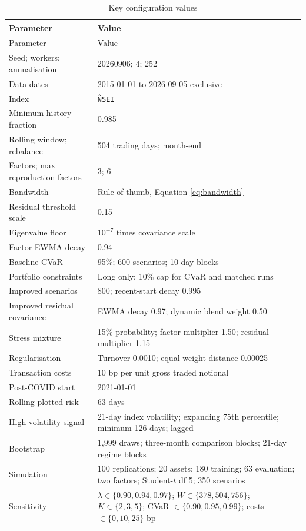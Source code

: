\documentclass[11pt,a4paper]{article}
\newcommand{\code}[1]{\texttt{#1}}
\begin{document}
\begin{longtable}{@{}p{}p{}@{}}
\caption{Key configuration values}\label{tab:config}\\
\toprule
Parameter & Value \\
\midrule
\endfirsthead
\toprule
Parameter & Value \\
\midrule
\endhead
Seed; workers; annualisation & 20260906; 4; 252 \\
Data dates & 2015-01-01 to 2026-09-05 exclusive \\
Index & \code{\^NSEI} \\
Minimum history fraction & 0.985 \\
Rolling window; rebalance & 504 trading days; month-end \\
Factors; max reproduction factors & 3; 6 \\
Bandwidth & Rule of thumb, Equation \eqref{eq:bandwidth} \\
Residual threshold scale & 0.15 \\
Eigenvalue floor & $10^{-7}$ times covariance scale \\
Factor EWMA decay & 0.94 \\
Baseline CVaR & 95\%; 600 scenarios; 10-day blocks \\
Portfolio constraints & Long only; 10\% cap for CVaR and matched runs \\
Improved scenarios & 800; recent-start decay 0.995 \\
Improved residual covariance & EWMA decay 0.97; dynamic blend weight 0.50 \\
Stress mixture & 15\% probability; factor multiplier 1.50; residual multiplier 1.15 \\
Regularisation & Turnover 0.0010; equal-weight distance 0.00025 \\
Transaction costs & 10 bp per unit gross traded notional \\
Post-COVID start & 2021-01-01 \\
Rolling plotted risk & 63 days \\
High-volatility signal & 21-day index volatility; expanding 75th percentile; minimum 126 days; lagged \\
Bootstrap & 1,999 draws; three-month comparison blocks; 21-day regime blocks \\
Simulation & 100 replications; 20 assets; 180 training; 63 evaluation; two factors; Student-$t$ df 5; 350 scenarios \\
Sensitivity & $\lambda\in\{0.90,0.94,0.97\}$; $W\in\{378,504,756\}$; $K\in\{2,3,5\}$; CVaR $\in\{0.90,0.95,0.99\}$; costs $\in\{0,10,25\}$ bp \\
\bottomrule
\end{longtable}
\end{document}
